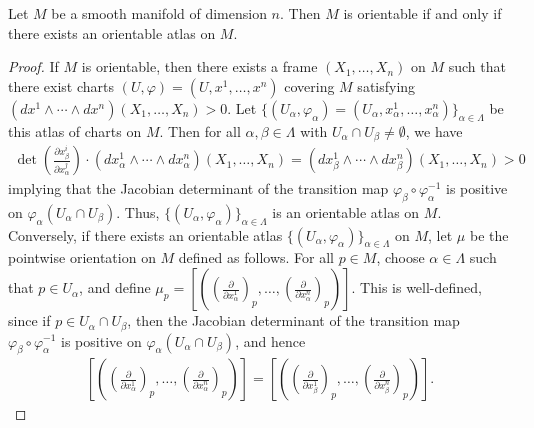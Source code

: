 \begin{proposition}
    Let $M$ be a smooth manifold of dimension $n$. Then $M$ is orientable if and only if there exists an orientable atlas on $M$.
\end{proposition}
\begin{proof}
    If $M$ is orientable, then there exists a frame $(X_{1},\ldots,X_{n})$ on $M$ such that there exist charts $(U,\varphi) = (U,x^{1},\ldots,x^{n})$ covering $M$ satisfying $(dx^{1} \wedge \cdots \wedge dx^{n})(X_{1},\ldots,X_{n}) > 0$. Let $\{(U_{\alpha},\varphi_{\alpha}) = (U_{\alpha},x^{1}_{\alpha},\ldots,x^{n}_{\alpha})\}_{\alpha \in \Lambda}$ be this atlas of charts on $M$. Then for all $\alpha,\beta \in \Lambda$ with $U_{\alpha} \cap U_{\beta} \neq \emptyset$, we have
    \begin{align}
         \det\left( \frac{\partial x^{i}_{\beta}}{\partial x^{j}_{\alpha}} \right) \cdot (dx^{1}_{\alpha} \wedge \cdots \wedge dx^{n}_{\alpha})(X_{1},\ldots,X_{n}) = (dx^{1}_{\beta} \wedge \cdots \wedge dx^{n}_{\beta})(X_{1},\ldots,X_{n}) > 0
    \end{align}
    implying that the Jacobian determinant of the transition map $\varphi_{\beta} \circ \varphi_{\alpha}^{-1}$ is positive on $\varphi_{\alpha}(U_{\alpha} \cap U_{\beta})$. Thus, $\{(U_{\alpha},\varphi_{\alpha})\}_{\alpha \in \Lambda}$ is an orientable atlas on $M$. Conversely, if there exists an orientable atlas $\{(U_{\alpha},\varphi_{\alpha})\}_{\alpha \in \Lambda}$ on $M$, let $\mu$ be the pointwise orientation on $M$ defined as follows. For all $p \in M$, choose $\alpha \in \Lambda$ such that $p \in U_{\alpha}$, and define $\mu_{p} = [((\frac{\partial}{\partial x^{1}_{\alpha}})_{p},\ldots,(\frac{\partial}{\partial x^{n}_{\alpha}})_{p})]$. This is well-defined, since if $p \in U_{\alpha} \cap U_{\beta}$, then the Jacobian determinant of the transition map $\varphi_{\beta} \circ \varphi_{\alpha}^{-1}$ is positive on $\varphi_{\alpha}(U_{\alpha} \cap U_{\beta})$, and hence
    \begin{align}
        \left[\left(\left(\frac{\partial}{\partial x^{1}_{\alpha}}\right)_{p},\ldots,\left(\frac{\partial}{\partial x^{n}_{\alpha}}\right)_{p}\right)\right] = \left[\left(\left(\frac{\partial}{\partial x^{1}_{\beta}}\right)_{p},\ldots,\left(\frac{\partial}{\partial x^{n}_{\beta}}\right)_{p}\right)\right].
    \end{align}
\end{proof}

